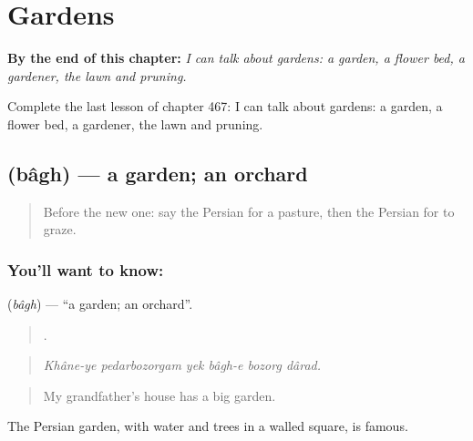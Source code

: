 
\chapter{Gardens}
\label{ch:fa-gardens}

\begin{chapteropening}
\textbf{By the end of this chapter:} \emph{I can talk about gardens: a garden, a flower bed, a gardener, the lawn and pruning.}

Complete the last lesson of chapter 467: I can talk about gardens: a garden, a flower bed, a gardener, the lawn and pruning.
\end{chapteropening}

\section[\texorpdfstring{\fa{باغ} (bâgh)}{باغ (bâgh)}]{ (bâgh) — a garden; an orchard}

\label{lesson:FA-C467-bagh}



\begin{quote}
Before the new one: say the Persian for a pasture, then the Persian for to graze.
\end{quote}

\subsection*{You'll want to know: }
\textbf{} (\emph{bâgh}) — \textquotedblleft{}a garden; an orchard\textquotedblright{}.

\begin{quote}
     .
\end{quote}

\begin{quote}
\emph{Khâne-ye pedarbozorgam yek bâgh-e bozorg dârad.}
\end{quote}

\begin{quote}
My grandfather's house has a big garden.
\end{quote}

The Persian garden, with water and trees in a walled square, is famous.

